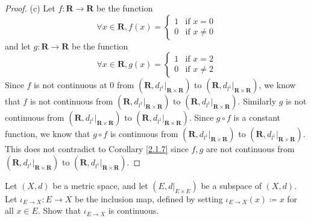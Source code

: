 \begin{proof}{(c)}
    Let \(f : \mathbf{R} \to \mathbf{R}\) be the function
    \[
        \forall x \in \mathbf{R}, f(x) = \begin{cases}
            1 & \text{if } x = 0    \\
            0 & \text{if } x \neq 0
        \end{cases}
    \]
    and let \(g : \mathbf{R} \to \mathbf{R}\) be the function
    \[
        \forall x \in \mathbf{R}, g(x) = \begin{cases}
            1 & \text{if } x = 2    \\
            0 & \text{if } x \neq 2
        \end{cases}
    \]
    Since \(f\) is not continuous at \(0\) from \((\mathbf{R}, d_{l^1}|_{\mathbf{R} \times \mathbf{R}})\) to \((\mathbf{R}, d_{l^1}|_{\mathbf{R} \times \mathbf{R}})\), we know that \(f\) is not continuous from \((\mathbf{R}, d_{l^1}|_{\mathbf{R} \times \mathbf{R}})\) to \((\mathbf{R}, d_{l^1}|_{\mathbf{R} \times \mathbf{R}})\).
    Similarly \(g\) is not continuous from \((\mathbf{R}, d_{l^1}|_{\mathbf{R} \times \mathbf{R}})\) to \((\mathbf{R}, d_{l^1}|_{\mathbf{R} \times \mathbf{R}})\).
    Since \(g \circ f\) is a constant function, we know that \(g \circ f\) is continuous from \((\mathbf{R}, d_{l^1}|_{\mathbf{R} \times \mathbf{R}})\) to \((\mathbf{R}, d_{l^1}|_{\mathbf{R} \times \mathbf{R}})\).
    This does not contradict to Corollary \ref{2.1.7} since \(f, g\) are not continuous from \((\mathbf{R}, d_{l^1}|_{\mathbf{R} \times \mathbf{R}})\) to \((\mathbf{R}, d_{l^1}|_{\mathbf{R} \times \mathbf{R}})\).
\end{proof}

\begin{exercise}\label{ex 2.1.5}
    Let \((X, d)\) be a metric space, and let \((E, d|_{E \times E})\) be a subspace of \((X, d)\).
    Let \(\iota_{E \to X} : E \to X\) be the inclusion map, defined by setting \(\iota_{E \to X}(x) \coloneqq x\) for all \(x \in E\).
    Show that \(\iota_{E \to X}\) is continuous.
\end{exercise}

